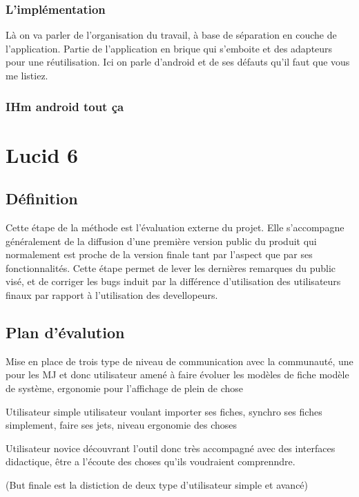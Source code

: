 \documentclass[11pt,a4paper]{report}
\begin{document}
\subsubsection{L'implémentation}

Là on va parler de l'organisation du travail, à base de séparation en couche de
l'application. Partie de l'application en brique qui s'emboite et des adapteurs
pour une réutilisation.
Ici on parle d'android et de ses défauts qu'il faut que vous me listiez. 

\subsubsection{IHm android tout ça}

\section{Lucid 6}

\subsection{Définition}

Cette étape de la méthode est l'évaluation externe du projet. Elle s'accompagne
généralement de la diffusion d'une première version public du produit qui
normalement est proche de la version finale tant par l'aspect que par ses
fonctionnalités.
Cette étape permet de lever les dernières remarques du public visé, et de
corriger les bugs induit par la différence d'utilisation des utilisateurs finaux
par rapport à l'utilisation des devellopeurs.


\subsection{Plan d'évalution}

Mise en place de trois type de niveau de communication avec la communauté,
une pour les MJ et donc utilisateur amené à faire évoluer les modèles de fiche
modèle de système, ergonomie pour l'affichage de plein de chose

Utilisateur simple utilisateur voulant importer ses fiches, synchro ses fiches
simplement, faire ses jets, niveau ergonomie des choses

Utilisateur novice découvrant l'outil donc très accompagné avec des interfaces
didactique, être a l'écoute des choses qu'ils voudraient comprenndre.

(But finale est la distiction de deux type d'utilisateur simple et avancé)
\end{document}
